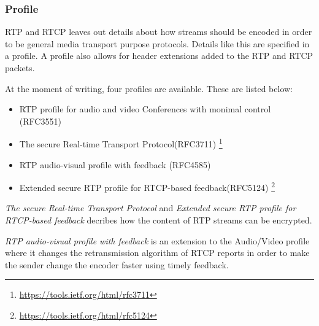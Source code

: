 \subsubsection{Profile} \label{sec:design:profile}
RTP and RTCP leaves out details about how streams should be encoded in order to be general media transport purpose protocols. Details like this are specified in a profile. A profile also allows for header extensions added to the RTP and RTCP packets.



At the moment of writing, four profiles are available. These are listed below:

\begin{itemize}
	\item RTP profile for audio and video Conferences with monimal control (RFC3551)
	\item The secure Real-time Transport Protocol(RFC3711) \footnote{\url{https://tools.ietf.org/html/rfc3711}}
	\item RTP audio-visual profile with feedback (RFC4585)
	\item Extended secure RTP profile for RTCP-based feedback(RFC5124) \footnote{\url{https://tools.ietf.org/html/rfc5124}}
\end{itemize} \citep{johnston2004sip}

\textit{The secure Real-time Transport Protocol} and \textit{Extended secure RTP profile for RTCP-based feedback} decribes how the content of RTP streams can be encrypted.

\textit{RTP audio-visual profile with feedback} is an extension to the Audio/Video profile where it changes the retransmission algorithm of RTCP reports in order to make the sender change the encoder faster using timely feedback. \citep{RFC4585}

